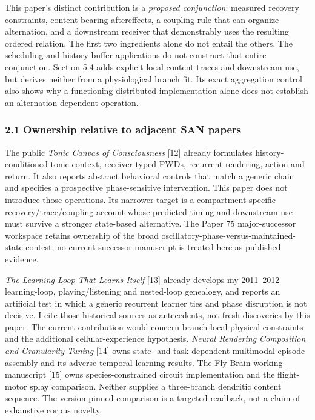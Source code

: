 \documentclass[
  american,
  11pt,
  letterpaper,
]{article}
\begin{document}
This paper's distinct contribution is a \emph{proposed conjunction}: measured recovery constraints, content-bearing aftereffects, a coupling rule that can organize alternation, and a downstream receiver that demonstrably uses the resulting ordered relation. The first two ingredients alone do not entail the others. The scheduling and history-buffer applications do not construct that entire conjunction. Section 5.4 adds explicit local content traces and downstream use, but derives neither from a physiological branch fit. Its exact aggregation control also shows why a functioning distributed implementation alone does not establish an alternation-dependent operation.

\subsubsection{2.1 Ownership relative to adjacent SAN papers}\label{ownership-relative-to-adjacent-san-papers}

The public \emph{Tonic Canvas of Consciousness} {[}12{]} already formulates history-conditioned tonic context, receiver-typed PWDs, recurrent rendering, action and return. It also reports abstract behavioral controls that match a generic chain and specifies a prospective phase-sensitive intervention. This paper does not introduce those operations. Its narrower target is a compartment-specific recovery/trace/coupling account whose predicted timing and downstream use must survive a stronger state-based alternative. The Paper 75 major-successor workspace retains ownership of the broad oscillatory-phase-versus-maintained-state contest; no current successor manuscript is treated here as published evidence.

\emph{The Learning Loop That Learns Itself} {[}13{]} already develops my 2011--2012 learning-loop, playing/listening and nested-loop genealogy, and reports an artificial test in which a generic recurrent learner ties and phase disruption is not decisive. I cite those historical sources as antecedents, not fresh discoveries by this paper. The current contribution would concern branch-local physical constraints and the additional cellular-experience hypothesis. \emph{Neural Rendering Composition and Granularity Tuning} {[}14{]} owns state- and task-dependent multimodal episode assembly and its adverse temporal-learning results. The Fly Brain working manuscript {[}15{]} owns species-constrained circuit implementation and the flight-motor splay comparison. Neither supplies a three-branch dendritic content sequence. The \href{https://github.com/v5ma/v5ma.github.io/blob/f6d3867df89ae9dea32f763b1d55c84212c41cc6/papers/companions/five-papers-20260923/temporal/paper/reviews/ADJACENT-PAPER-OWNERSHIP-READBACK-20260922.md}{version-pinned comparison} is a targeted readback, not a claim of exhaustive corpus novelty.
\end{document}
